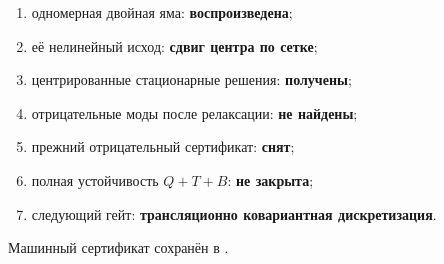 \begin{protocol}
\begin{enumerate}
 \item одномерная двойная яма: \textbf{воспроизведена};
 \item её нелинейный исход: \textbf{сдвиг центра по сетке};
 \item центрированные стационарные решения: \textbf{получены};
 \item отрицательные моды после релаксации: \textbf{не найдены};
 \item прежний отрицательный сертификат: \textbf{снят};
 \item полная устойчивость $Q+T+B$: \textbf{не закрыта};
 \item следующий гейт: \textbf{трансляционно ковариантная дискретизация}.
\end{enumerate}
\end{protocol}

Машинный сертификат сохранён в
.